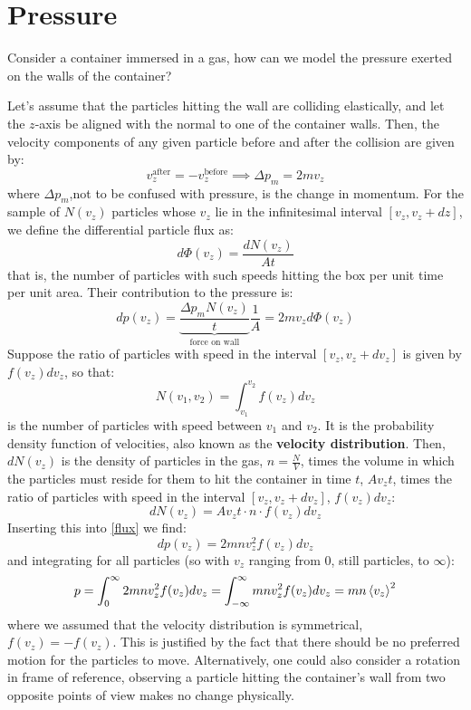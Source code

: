 \documentclass[a4paper,11pt,oneside]{book}
\begin{document}
\section{Pressure}
Consider a container immersed in a gas, how can we model the pressure exerted on the walls of the container? 


Let's assume that the particles hitting the wall are colliding elastically, and let the $z$-axis be aligned with the normal to one of the container walls. Then, the velocity components of any given particle before and after the collision are given by:
\begin{equation}
    v_z^{\text{after}}=-v_z^{\text{before}} \implies \Delta p_m = 2mv_z
\end{equation}
where $\Delta p_m$,not to be confused with pressure, is the change in momentum. For the sample of $N(v_z)$ particles whose $v_z$ lie in the infinitesimal interval $[v_z, v_z+dz]$, we define the differential particle flux as:
\begin{equation}\label{flux}
    d \Phi(v_z) = \frac{dN(v_z)}{At}
\end{equation}
that is, the number of particles with such speeds hitting the box per unit time per unit area. Their contribution to the pressure is:
\begin{equation}
  dp(v_z) =  \underbrace{\frac{\Delta p_m N(v_z)}{t}}_{\text{force on wall}} \frac{1}{A} = 2mv_z d\Phi(v_z)     
\end{equation}
Suppose the ratio of particles with speed in the interval $[v_z, v_z+dv_z]$ is given by $f(v_z) dv_z$, so that:
\begin{equation}
    N(v_1,v_2) = \int_{v_1}^{v_2} f(v_z) dv_z
\end{equation}
is the number of particles with speed between $v_1$ and $v_2$. It is the probability density function of velocities, also known as the \textbf{velocity distribution}. Then, $dN(v_z)$ is the density of particles in the gas, $n=\frac{N}{V}$, times the volume in which the particles must reside for them to hit the container in time $t$, $A v_z t$, times the ratio of particles with speed in the interval $[v_z, v_z+dv_z]$, $f(v_z) dv_z$:
\begin{equation}
    dN(v_z) = A v_z t \cdot n \cdot f(v_z) dv_z 
\end{equation}
Inserting this into \eqref{flux} we find:
\begin{equation}
    dp(v_z) = 2mnv_z^2f(v_z)dv_z
\end{equation}
and integrating for all particles (so with $v_z$ ranging from $0$, still particles, to $\infty$):
\begin{equation}
    p = \int_0^\infty 2mnv_z^2 f(v_z) dv_z = \int_{-\infty}^\infty mnv_z^2 f(v_z) dv_z = mn \braket{v_z}^2
\end{equation}
where we assumed that the velocity distribution is symmetrical, $f(v_z)=-f(v_z)$. This is justified by the fact that there should be no preferred motion for the particles to move. Alternatively, one could also consider a rotation in frame of reference, observing a particle hitting the container's wall from two opposite points of view makes no change physically. 
\end{document}
